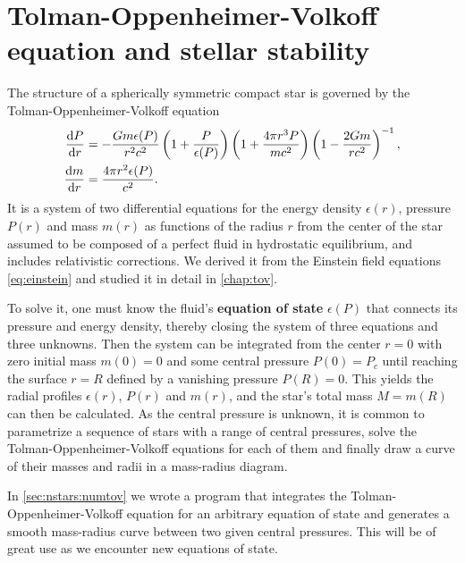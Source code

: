 
\section{Tolman-Oppenheimer-Volkoff equation and stellar stability}
\label{sec:master_intro:tov}

The structure of a spherically symmetric compact star is governed by the Tolman-Oppenheimer-Volkoff equation
\begin{subequations}
\begin{align}
	\odv{P}{r} &= -\frac{G m \epsilon(P)}{r^2 c^2} \left( 1 + \frac{P}{\epsilon(P)} \right) \left( 1 + \frac{4 \pi r^3 P}{m c^2} \right) \left( 1 - \frac{2 G m}{r c^2} \right)^{-1} , \\
	\odv{m}{r} &= \frac{4 \pi r^2 \epsilon(P)}{c^2} .
\end{align}
\label{eq:master_intro:tov}
\end{subequations}
It is a system of two differential equations for the energy density $\epsilon(r)$, pressure $P(r)$ and mass $m(r)$ as functions of the radius $r$ from the center of the star assumed to be composed of a perfect fluid in hydrostatic equilibrium, and includes relativistic corrections.
We derived it from the Einstein field equations \eqref{eq:einstein} and studied it in detail in \cref{chap:tov}.

To solve it, one must know the fluid's \textbf{equation of state} $\epsilon(P)$ that connects its pressure and energy density, thereby closing the system of three equations and three unknowns.
Then the system can be integrated from the center $r=0$ with zero initial mass $m(0) = 0$ and some central pressure $P(0) = P_c$ until reaching the surface $r=R$ defined by a vanishing pressure $P(R) = 0$.
This yields the radial profiles $\epsilon(r)$, $P(r)$ and $m(r)$, and the star's total mass $M = m(R)$ can then be calculated.
As the central pressure is unknown, it is common to parametrize a sequence of stars with a range of central pressures, solve the Tolman-Oppenheimer-Volkoff equations for each of them and finally draw a curve of their masses and radii in a mass-radius diagram.

In \cref{sec:nstars:numtov} we wrote a program that integrates the Tolman-Oppenheimer-Volkoff equation for an arbitrary equation of state and generates a smooth mass-radius curve between two given central pressures.
This will be of great use as we encounter new equations of state.

